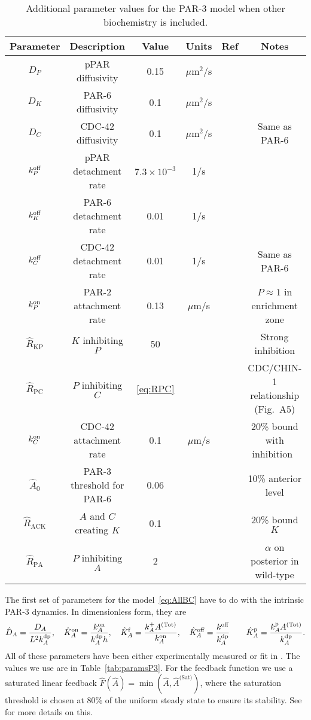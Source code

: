 \documentclass[11pt]{article}
\newcommand{\6}[1]{#1_{\text{6}}}
\newcommand{\3}[1]{#1_{\text{3}}}
\newcommand{\Tot}[1]{#1^\text{(Tot)}}
\newcommand{\Sat}[1]{#1^\text{(Sat)}}
\newcommand{\A}[1]{#1_A}
\begin{document}
\begin{table}
\begin{small}
\centering
\begin{tabular}{|c|c|c|c|c|c|}\hline
Parameter & Description & Value & Units & Ref & Notes \\ \hline
$D_P$ & pPAR diffusivity & 0.15 & $\mu$m$^2$/s & \cite{goehring2011polarization}&  \\ 
$D_K$ & PAR-6 diffusivity & 0.1 & $\mu$m$^2$/s & \cite{robin2014single}&  \\ 
$D_C$ & CDC-42 diffusivity & 0.1 & $\mu$m$^2$/s && Same as PAR-6 \\ 
$k^\text{off}_P$ & pPAR detachment rate & $7.3 \times 10^{-3}$ & 1/s & \cite{goehring2011polarization}&  \\  
$k^\text{off}_K$ & PAR-6 detachment rate & 0.01 & 1/s & \cite{robin2014single}&  \\  
$k^\text{off}_C$ & CDC-42 detachment rate & 0.01 & 1/s & &  Same as PAR-6\\  \hline
$k^\text{on}_P$ & PAR-2 attachment rate & 0.13 & $\mu$m/s & \cite{gross2019guiding} & $P \approx 1$ in enrichment zone\\
$\hat{R}_\text{KP}$ & $K$ inhibiting $P$ &50  &  &  & Strong inhibition\\
$\hat R_\text{PC}$ & $P$ inhibiting $C$ & \eqref{eq:RPC}  & & \cite{sailer2015dynamic} & CDC/CHIN-1 relationship (Fig.\ A5)\\ 
$k^\text{on}_C$ & CDC-42 attachment rate & 0.1 & $\mu$m/s & & 20\% bound with inhibition\ \\ 
$\hat A_0$ & PAR-3 threshold for PAR-6 & 0.06&  & \cite{sailer2015dynamic}& 10\% anterior level \\
$\hat{R}_\text{ACK}$ & $A$ and $C$ creating $K$ & 0.1  &  &  & 20\% bound $K$\\
$\hat{R}_\text{PA}$ & $P$ inhibiting $A$ & 2  &  &  & $\alpha$ on posterior in wild-type\\ \hline
\end{tabular}
\caption{\label{tab:paramsBC}Additional parameter values for the PAR-3 model when other biochemistry is included.}
\end{small}
\end{table}

The first set of parameters for the model\ \eqref{eq:AllBC} have to do with the intrinsic PAR-3 dynamics. In dimensionless form, they are 
\begin{equation*}
\DhatA =\frac{D_A}{L^2 \A{\kdp}}, \quad \KhatonA=\frac{\A{\kon}}{\A{\kdp} h }, \quad \KhatfA = \frac{\A{\kf}\Tot{A}}{\A{\kon}}, \quad  \KhatoffA = \frac{\koff}{\A{\kdp}} \qquad \KhatpA = \frac{\A{\kp} \Tot{A}}{\A{\kdp}}.
\end{equation*}
All of these parameters have been either experimentally measured or fit in \cite{lang2023oligomerization}. The values we use are in Table\ \ref{tab:paramsP3}. For the feedback function we use a saturated linear feedback $\hat F(\hat A) = \min\left(\hat A, \Sat{\hat A}\right)$, where the saturation threshold is chosen at 80\% of the uniform steady state to ensure its stability. See \cite{lang2023oligomerization} for more details on this. 
\end{document}
